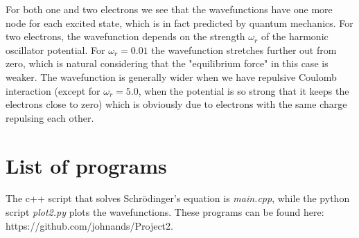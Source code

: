\documentclass[a4paper,12pt, english]{article}
\begin{document}
\begin{figure}[hbt]
\begin{center}
\end{center}
\end{figure} 

For both one and two electrons we see that the wavefunctions have one more node for each excited state, 
which is in fact predicted by quantum mechanics. For two electrons, the wavefunction depends on the 
strength $\omega_r$ of the harmonic oscillator potential. For $\omega_r = 0.01$ the wavefunction 
stretches further out from zero, which is natural considering that the "equilibrium force" in this 
case is weaker. The wavefunction is generally wider when we have repulsive Coulomb interaction 
(except for $\omega_r = 5.0$, when the potential is so strong that it keeps the electrons close to zero) 
which is obviously due to electrons with the same charge repulsing each other. 

\section*{List of programs}
The c++ script that solves Schr\"odinger's equation is \textit{main.cpp}, while the python 
script \textit{plot2.py} plots the wavefunctions. These programs can be found here: 
https://github.com/johnands/Project2. 
\end{document}
